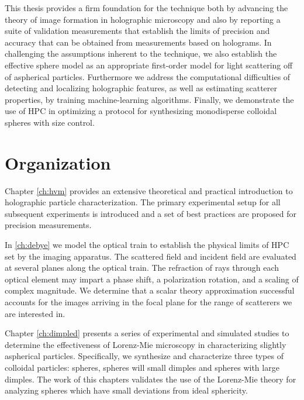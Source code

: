 This thesis provides a firm foundation for the technique both by
advancing the theory of image formation in holographic microscopy
and also by reporting a suite of validation measurements
that establish the limits of precision and accuracy that can be
obtained from measurements based on holograms. In challenging
the assumptions inherent to the technique, we also establish the
effective sphere model as an appropriate first-order model for
light scattering off of aspherical particles. Furthermore
we address the computational difficulties of detecting and localizing
holographic features, as well as estimating scatterer properties, by
training machine-learning algorithms. Finally, we demonstrate the use
of HPC in optimizing a protocol for synthesizing monodisperse
colloidal spheres with size control.

\section{Organization}

Chapter \ref{ch:hvm} provides an extensive theoretical and practical
introduction to holographic particle characterization. The primary
experimental setup for all subsequent experiments is introduced and
a set of best practices are proposed for precision measurements. 

In \autoref{ch:debye} we model the optical train to establish the
physical limits of HPC set by the imaging apparatus. The scattered
field and incident field are evaluated at several planes along the
optical train. The refraction of rays through each optical element
may impart a phase shift, a polarization rotation, and a scaling
of complex magnitude. We determine that a scalar theory
approximation successful accounts for the images arriving in the
focal plane for the range of scatterers we are interested in.

Chapter \ref{ch:dimpled} presents a series of experimental and
simulated studies to determine the effectiveness of Lorenz-Mie
microscopy in characterizing slightly aspherical particles.
Specifically, we synthesize and characterize three types of colloidal
particles: spheres, spheres will small dimples and spheres with large dimples.
The work of this chapters validates the use of the Lorenz-Mie theory
for analyzing spheres which have small deviations from
ideal sphericity. 

